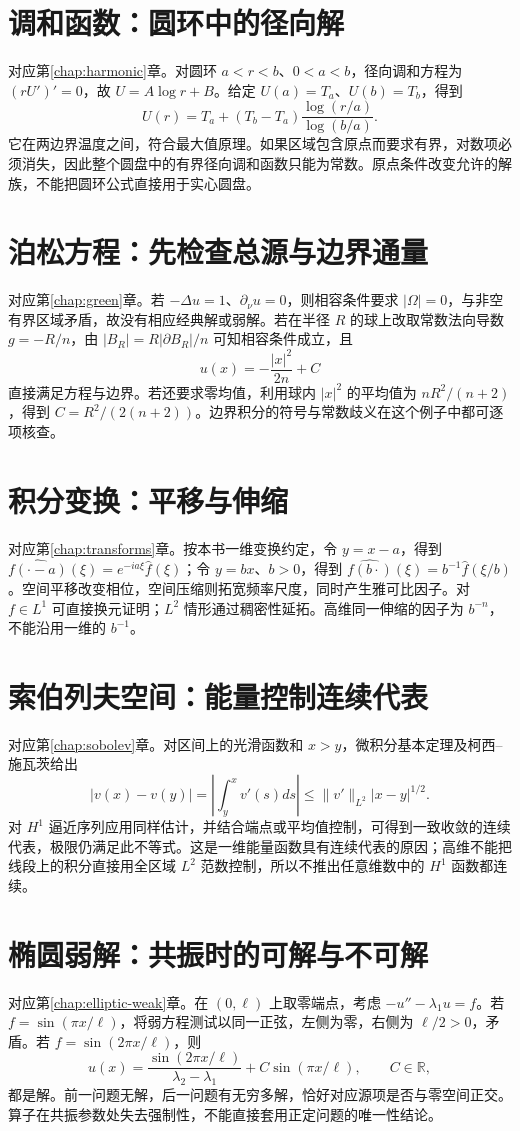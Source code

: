 \documentclass[UTF8,12pt,a4paper,fontset=fandol]{ctexbook}
\begin{document}
\section{调和函数：圆环中的径向解}
对应第\ref{chap:harmonic}章。对圆环 $a<r<b$、$0<a<b$，径向调和方程为 $(rU')'=0$，故 $U=A\log r+B$。给定 $U(a)=T_a$、$U(b)=T_b$，得到
\[
 U(r)=T_a+(T_b-T_a)\frac{\log(r/a)}{\log(b/a)}.
\]
它在两边界温度之间，符合最大值原理。如果区域包含原点而要求有界，对数项必须消失，因此整个圆盘中的有界径向调和函数只能为常数。原点条件改变允许的解族，不能把圆环公式直接用于实心圆盘。

\section{泊松方程：先检查总源与边界通量}
对应第\ref{chap:green}章。若 $-\Delta u=1$、$\partial_\nu u=0$，则相容条件要求 $|\Omega|=0$，与非空有界区域矛盾，故没有相应经典解或弱解。若在半径 $R$ 的球上改取常数法向导数 $g=-R/n$，由 $|B_R|=R|\partial B_R|/n$ 可知相容条件成立，且
\[
 u(x)=-\frac{|x|^2}{2n}+C
\]
直接满足方程与边界。若还要求零均值，利用球内 $|x|^2$ 的平均值为 $nR^2/(n+2)$，得到 $C=R^2/(2(n+2))$。边界积分的符号与常数歧义在这个例子中都可逐项核查。

\section{积分变换：平移与伸缩}
对应第\ref{chap:transforms}章。按本书一维变换约定，令 $y=x-a$，得到 $\widehat{f(\cdot-a)}(\xi)=e^{-ia\xi}\widehat f(\xi)$；令 $y=bx$、$b>0$，得到 $\widehat{f(b\cdot)}(\xi)=b^{-1}\widehat f(\xi/b)$。空间平移改变相位，空间压缩则拓宽频率尺度，同时产生雅可比因子。对 $f\in L^1$ 可直接换元证明；$L^2$ 情形通过稠密性延拓。高维同一伸缩的因子为 $b^{-n}$，不能沿用一维的 $b^{-1}$。

\section{索伯列夫空间：能量控制连续代表}
对应第\ref{chap:sobolev}章。对区间上的光滑函数和 $x>y$，微积分基本定理及柯西--施瓦茨给出
\[
 |v(x)-v(y)|=\left|\int_y^xv'(s)ds\right|
 \le\|v'\|_{L^2}|x-y|^{1/2}.
\]
对 $H^1$ 逼近序列应用同样估计，并结合端点或平均值控制，可得到一致收敛的连续代表，极限仍满足此不等式。这是一维能量函数具有连续代表的原因；高维不能把线段上的积分直接用全区域 $L^2$ 范数控制，所以不推出任意维数中的 $H^1$ 函数都连续。

\section{椭圆弱解：共振时的可解与不可解}
对应第\ref{chap:elliptic-weak}章。在 $(0,\ell)$ 上取零端点，考虑 $-u''-\lambda_1u=f$。若 $f=\sin(\pi x/\ell)$，将弱方程测试以同一正弦，左侧为零，右侧为 $\ell/2>0$，矛盾。若 $f=\sin(2\pi x/\ell)$，则
\[
 u(x)=\frac{\sin(2\pi x/\ell)}{\lambda_2-\lambda_1}
       +C\sin(\pi x/\ell),\qquad C\in\mathbb R,
\]
都是解。前一问题无解，后一问题有无穷多解，恰好对应源项是否与零空间正交。算子在共振参数处失去强制性，不能直接套用正定问题的唯一性结论。
\end{document}
